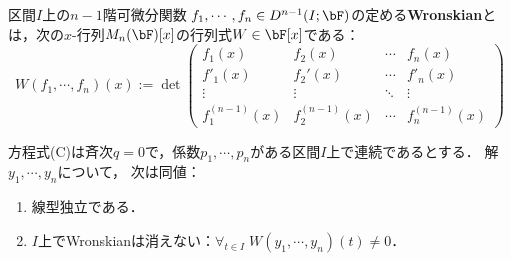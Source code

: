 \documentclass[uplatex,dvipdfmx]{jsreport}
\begin{document}
\begin{definition}
    区間$I$上の$n-1$階可微分関数
    $f_1,\cdots,f_n\in D^{n-1}(I;\bF)$の定める\textbf{Wronskian}とは，次の$x$-行列$M_n(\bF)[x]$の行列式$W\in \bF[x]$である：
    \[W(f_1,\cdots,f_n)(x):=\det \begin{pmatrix}f_1(x)&f_2(x)&\cdots&f_n(x)\\f'_1(x)&f_2'(x)&\cdots&f'_n(x)\\\vdots&\vdots&\ddots&\vdots\\f_1^{(n-1)}(x)&f_2^{(n-1)}(x)&\cdots&f^{(n-1)}_n(x)\end{pmatrix}\]
\end{definition}

\begin{theorem}[解の独立性の特徴付け]\label{thm-independentness-of-solution-to-linear-ODE}
    方程式(C)は斉次$q=0$で，係数$p_1,\cdots,p_n$がある区間$I$上で連続であるとする．
    解$y_1,\cdots,y_n$について，
    次は同値：
    \begin{enumerate}
        \item 線型独立である．
        \item $I$上でWronskianは消えない：$\forall_{t\in I}\;W(y_1,\cdots,y_n)(t)\ne0$．
    \end{enumerate}
\end{theorem}
\end{document}
